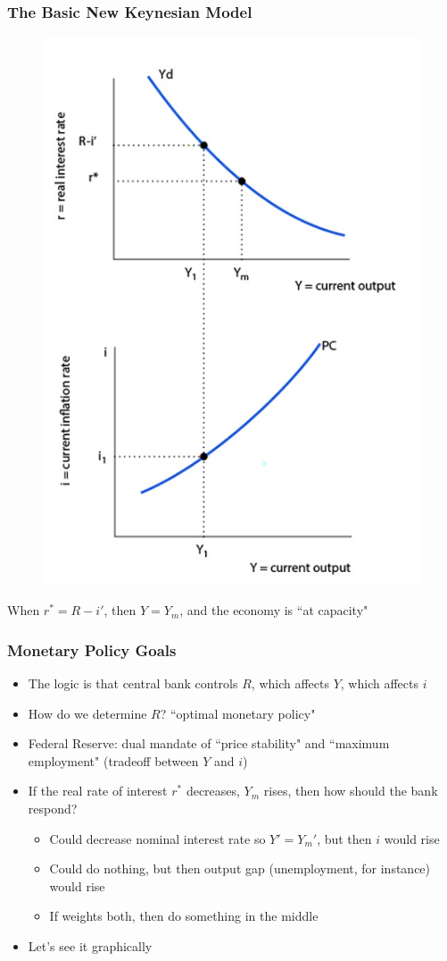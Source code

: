 \documentclass{beamer}
\begin{document}
\begin{frame}
\frametitle[alignment=center]{The Basic New Keynesian Model}
\begin{figure}
\centering
\includegraphics[scale=0.75]{Figures/W_Fig_15pt1.png}
\end{figure}
When $r^*=R-i'$, then $Y=Y_m$, and the economy is ``at capacity"
\end{frame}

\begin{frame}
\frametitle[alignment=center]{Monetary Policy Goals}
\begin{itemize}
\item The logic is that central bank controls $R$, which affects $Y$, which affects $i$
\bigskip
\item How do we determine $R$?  ``optimal monetary policy"
\bigskip
\item Federal Reserve: dual mandate of ``price stability" and ``maximum employment" (tradeoff between $Y$ and $i$)
\bigskip
\item If the real rate of interest $r^*$ decreases, $Y_m$ rises, then how should the bank respond?
\begin{itemize}
\item Could decrease nominal interest rate so $Y'=Y_m'$, but then $i$ would rise
\item Could do nothing, but then output gap (unemployment, for instance) would rise
\item If weights both, then do something in the middle
\end{itemize}
\item Let's see it graphically
\end{itemize}
\end{frame}
\end{document}
